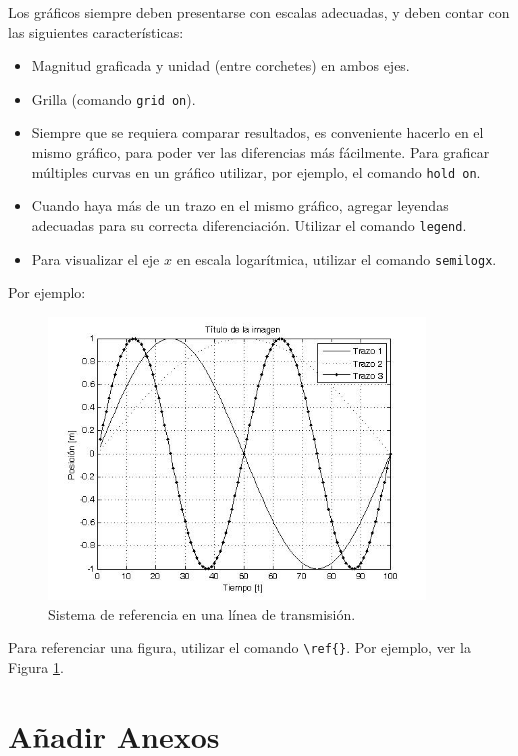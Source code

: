 \documentclass{article}
\begin{document}
Los gráficos siempre deben presentarse con escalas adecuadas, y deben contar con las siguientes características:

\begin{itemize}
 \item Magnitud graficada y unidad (entre corchetes) en ambos ejes.
 \item Grilla (comando \texttt{grid on}).
 \item Siempre que se requiera comparar resultados, es conveniente hacerlo en el mismo gráfico, para poder ver las diferencias más fácilmente. Para graficar múltiples curvas en un gráfico utilizar, por ejemplo, el comando \texttt{hold on}.
 \item Cuando haya más de un trazo en el mismo gráfico, agregar leyendas adecuadas para su correcta diferenciación. Utilizar el comando \texttt{legend}.
 \item Para visualizar el eje $x$ en escala logarítmica, utilizar el comando \texttt{semilogx}.
\end{itemize}

Por ejemplo:

\begin{figure}[H]	%
 \centering			%
 \includegraphics[width = 10cm]{grafico_matlab}	%
 \caption{Sistema de referencia en una línea de transmisión.}	%
 \label{figura1}
\end{figure}

Para referenciar una figura, utilizar el comando \verb|\ref{}|. Por ejemplo, ver la Figura \ref{figura1}.

\section{Añadir Anexos}
\end{document}
